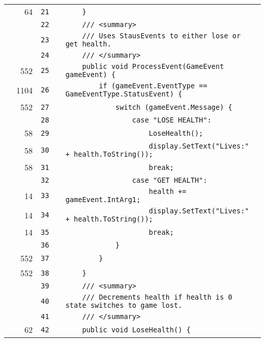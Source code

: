 \documentclass[a4paper,landscape,10pt]{article}
\begin{document}
\begin{longtable}[l]{lrrll}
\cellcolor{green} & 64 & \verb~21~ & & \verb~    }~\\
\cellcolor{gray} &  & \verb~22~ & & \verb~    /// <summary>~\\
\cellcolor{gray} &  & \verb~23~ & & \verb~    /// Uses StausEvents to either lose or get health.~\\
\cellcolor{gray} &  & \verb~24~ & & \verb~    /// </summary>~\\
\cellcolor{green} & 552 & \verb~25~ & & \verb~    public void ProcessEvent(GameEvent gameEvent) {~\\
\cellcolor{green} & 1104 & \verb~26~ & & \verb~        if (gameEvent.EventType == GameEventType.StatusEvent) {~\\
\cellcolor{green} & 552 & \verb~27~ & & \verb~            switch (gameEvent.Message) {~\\
\cellcolor{gray} &  & \verb~28~ & & \verb~                case "LOSE HEALTH":~\\
\cellcolor{green} & 58 & \verb~29~ & & \verb~                    LoseHealth();~\\
\cellcolor{green} & 58 & \verb~30~ & & \verb~                    display.SetText("Lives:" + health.ToString());~\\
\cellcolor{green} & 58 & \verb~31~ & & \verb~                    break;~\\
\cellcolor{gray} &  & \verb~32~ & & \verb~                case "GET HEALTH":~\\
\cellcolor{green} & 14 & \verb~33~ & & \verb~                    health += gameEvent.IntArg1;~\\
\cellcolor{green} & 14 & \verb~34~ & & \verb~                    display.SetText("Lives:" + health.ToString());~\\
\cellcolor{green} & 14 & \verb~35~ & & \verb~                    break;~\\
\cellcolor{gray} &  & \verb~36~ & & \verb~            }~\\
\cellcolor{green} & 552 & \verb~37~ & & \verb~        }~\\
\cellcolor{green} & 552 & \verb~38~ & & \verb~    }~\\
\cellcolor{gray} &  & \verb~39~ & & \verb~    /// <summary>~\\
\cellcolor{gray} &  & \verb~40~ & & \verb~    /// Decrements health if health is 0 state switches to game lost.~\\
\cellcolor{gray} &  & \verb~41~ & & \verb~    /// </summary>~\\
\cellcolor{green} & 62 & \verb~42~ & & \verb~    public void LoseHealth() {~\\

\end{longtable}
\end{document}
